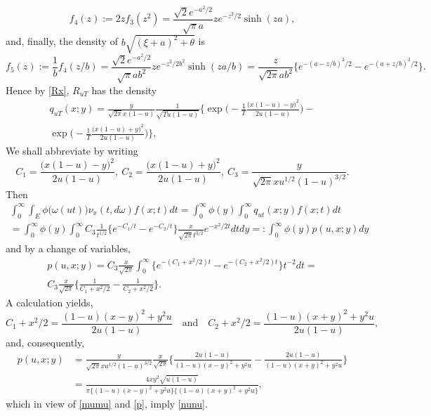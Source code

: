 \documentclass[reqno,10pt]{amsart}
\theoremstyle{definition}
\theoremstyle{remark}
\numberwithin{equation}{section}
\begin{document}
$$
f_4(z) := 2z f_3(z^2)=
\frac{\sqrt{2}e^{-a^2/2}}{\sqrt{\pi} a}ze^{- z^2/2}\sinh(za),
$$
and, finally, the density  of $b\sqrt{(\xi+a)^2+\theta}$
is
$$
f_5(z):=\frac 1 b f_4(z/b)=\frac{\sqrt{2}e^{-a^2/2}}{\sqrt{\pi} a b^2}ze^{- z^2/2b^2}\sinh(za/b)=
\frac{z}{\sqrt{2\pi} ab^2}\bigg\{e^{-(a-z/b)^2/2}-e^{-(a+z/b)^2/2}\bigg\}.
$$
Hence by \eqref{Rx}, $R_{uT}$ has the density
\begin{multline*}
q_{uT}(x;y)=\frac{y}{\sqrt{2\pi} x(1-u)}\frac{1}{\sqrt{Tu(1-u)}}
\bigg\{\exp\bigg(-\frac{1}{T}\frac{\big(x(1-u)-y\big)^2}{2u(1-u)}\bigg)
-\\
\exp\bigg(-\frac{1}{T}\frac{\big(x(1-u)+y\big)^2}{2u(1-u)}\bigg)\bigg\},
\end{multline*}
We shall abbreviate by writing
$$
C_1=\frac{\big(x(1-u)-y\big)^2}{2u(1-u)}, \ C_2=\frac{\big(x(1-u)+y\big)^2}{2u(1-u)},\
C_3=\frac{y}{\sqrt{2\pi} xu^{1/2}(1-u)^{3/2}}.
$$
Then
\begin{multline*}
\int_0^\infty \int_E \phi\big(\omega(ut)\big) \nu_x(t,d\omega) f(x;t)dt=
\int_0^\infty \phi(y)\int_0^\infty q_{ut}(x;y)f(x;t)dt\\
=\int_0^\infty \phi(y)\int_0^\infty
C_3\frac{1}{t^{1/2}}
\Big\{e^{-C_1/t}-e^{-C_2/t}\Big\}
\frac{x}{\sqrt{2\pi} t^{3/2}}
e^{-x^2/2t}dtdy
=:\int_0^\infty \phi(y)p(u,x;y)dy
\end{multline*}
and by a change of  variables,
\begin{multline*}
p(u,x;y)=C_3\frac{x}{\sqrt{2\pi}}
\int_0^\infty
\Big\{e^{-(C_1+x^2/2)t}-e^{-(C_2+x^2/2)t}\Big\}
t^{-2}dt= \\
C_3\frac{x}{\sqrt{2\pi}}
\bigg\{\frac{1}{C_1+x^2/2}-\frac{1}{C_2+x^2/2}\bigg\}.
\end{multline*}
A calculation yields,
$$
C_1+x^2/2=
\frac{
(1-u)(x-y)^2+y^2u}{2u(1-u)}\quad \text{and}\quad
C_2+x^2/2=\frac{
(1-u)(x+y)^2+y^2u}{2u(1-u)},
$$
and, consequently,
\begin{align*}
p(u,x;y)&=
\frac{y}{\sqrt{2\pi} xu^{1/2}(1-u)^{3/2}}
\frac{x}{\sqrt{2\pi}}
\bigg\{
\frac{2u(1-u)}{
(1-u)(x-y)^2+y^2u}
-
\frac{2u(1-u)}{
(1-u)(x+y)^2+y^2u}
\bigg\}
\\
&=\frac{4xy^2\sqrt{u(1-u)}}{\pi\big\{(1-u)(x-y)^2+y^2u\big\}\big\{(1-u)(x+y)^2+y^2u\big\}},
\end{align*}
which in view of \eqref{mumu} and  \eqref{p}, imply  \eqref{nunu}.
\end{document}
